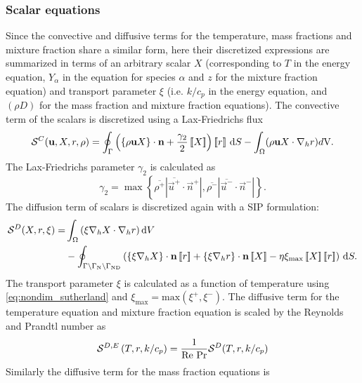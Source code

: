 \subsubsection{Scalar equations}
Since the convective and diffusive terms for the temperature, mass fractions and mixture fraction share a similar form,  here their discretized expressions are summarized in terms of an arbitrary scalar $X$ (corresponding to $T$ in the energy equation, $Y_\alpha$ in the equation for species $\alpha$ and $z$ for the mixture fraction equation) and transport parameter $\xi$ (i.e. $k/c_p$ in the energy equation, and $(\rho D)$ for the mass fraction and mixture fraction equations). The convective term of the scalars is discretized using a Lax-Friedrichs flux
\begin{equation}
	\mathcal{S}^C(\textbf{u},X,r, \rho) =  \oint_{\Gamma}{\left( \left\{{\rho\textbf{u}X }\right\}\cdot \textbf{n} + \frac{\gamma_2}{2}\left[\!\left[{{X}}\right]\!\right]\right)\left[\!\left[{{r}}\right]\!\right] \,\mathrm{d} S}
	- \int_{\Omega}({\rho \textbf{u} X \cdot \nabla_h r) d\text{V}}. \label{eq:scalar_convective}
\end{equation}
The Lax-Friedrichs parameter $\gamma_2$ is calculated as 
\begin{equation}
	\gamma_2  = \max \left\{\overline{\rho^+} |\overline{\vec{u}^+} \cdot \vec{n}^+|,\overline{\rho^-} |\overline{\vec{u}^-} \cdot \vec{n}^-|\right\}.
	\label{eq:vardens_lambda2}
\end{equation}
The diffusion term of scalars is discretized again with a SIP formulation:
\begin{align}
	\mathcal{S}^D(X,r,\xi)= & \int_{\Omega}{ \left(\xi \nabla_h X \cdot\nabla_h r\right) }\dV \notag         \\
	                        & -\oint_{\Gamma \setminus \Gamma_{\text{N}}\setminus \Gamma_{\text{ND}}}{\left(
		\mean{\xi \nabla_h X}\cdot \vec{n}\jump{r} +
		\mean{\xi \nabla_h r}\cdot \vec{n}\jump{X} -
		\eta \xi_{\text{max}} \jump{X} \jump{r}
		\right) \dS.
	} \label{eq:Temp_diffusive}
\end{align}
The transport parameter $\xi$ is calculated as a function of temperature using \cref{eq:nondim_sutherland} and $\xi_{\text{max}} = \text{max}(\xi^{+}, \xi^{-})$.
The diffusive term for the temperature equation  and mixture fraction equation is scaled by the Reynolds and Prandtl number as
\begin{equation}
\mathcal{S}^{D,E}\left(T,r,k/c_p\right) = \frac{1}{\text{Re}~\text{Pr}} \mathcal{S}^D(T,r,k/c_p)
\end{equation}
Similarly the diffusive term for the mass fraction equations is
